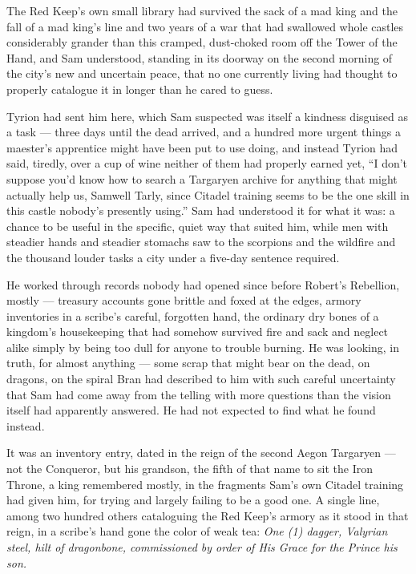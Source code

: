 The Red Keep’s own small library had survived the sack of a mad king and the fall of a mad king’s line and two years of a war that had swallowed whole castles considerably grander than this cramped, dust-choked room off the Tower of the Hand, and Sam understood, standing in its doorway on the second morning of the city’s new and uncertain peace, that no one currently living had thought to properly catalogue it in longer than he cared to guess.

Tyrion had sent him here, which Sam suspected was itself a kindness disguised as a task — three days until the dead arrived, and a hundred more urgent things a maester’s apprentice might have been put to use doing, and instead Tyrion had said, tiredly, over a cup of wine neither of them had properly earned yet, “I don’t suppose you’d know how to search a Targaryen archive for anything that might actually help us, Samwell Tarly, since Citadel training seems to be the one skill in this castle nobody’s presently using.” Sam had understood it for what it was: a chance to be useful in the specific, quiet way that suited him, while men with steadier hands and steadier stomachs saw to the scorpions and the wildfire and the thousand louder tasks a city under a five-day sentence required.

He worked through records nobody had opened since before Robert’s Rebellion, mostly — treasury accounts gone brittle and foxed at the edges, armory inventories in a scribe’s careful, forgotten hand, the ordinary dry bones of a kingdom’s housekeeping that had somehow survived fire and sack and neglect alike simply by being too dull for anyone to trouble burning. He was looking, in truth, for almost anything — some scrap that might bear on the dead, on dragons, on the spiral Bran had described to him with such careful uncertainty that Sam had come away from the telling with more questions than the vision itself had apparently answered. He had not expected to find what he found instead.

\sceneBreak

It was an inventory entry, dated in the reign of the second Aegon Targaryen — not the Conqueror, but his grandson, the fifth of that name to sit the Iron Throne, a king remembered mostly, in the fragments Sam’s own Citadel training had given him, for trying and largely failing to be a good one. A single line, among two hundred others cataloguing the Red Keep’s armory as it stood in that reign, in a scribe’s hand gone the color of weak tea: \textit{One (1) dagger, Valyrian steel, hilt of dragonbone, commissioned by order of His Grace for the Prince his son.}

